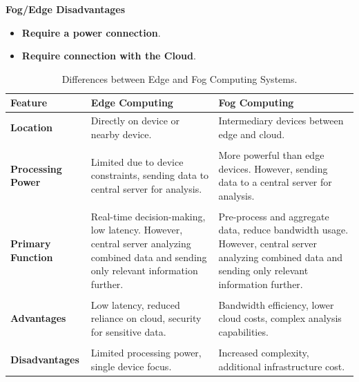 \documentclass[a4paper]{article}
\begin{document}
    \begin{flushleft}
        \textcolor{Red2}{ \textbf{Fog/Edge Disadvantages}}
    \end{flushleft}
    \begin{itemize}
        \item \textbf{Require a power connection}.
        \item \textbf{Require connection with the Cloud}.
    \end{itemize}

    \newpage

    \begin{table}[!htp]
        \centering
        \begin{tabular}{@{} l p{11.5em} p{11.5em} @{}}
            \toprule
            \textbf{Feature} & \textbf{Edge Computing} & \textbf{Fog Computing} \\
            \midrule
            \textbf{Location} & Directly on device or nearby device. & Intermediary devices between edge and cloud. \\
            \\
            \textbf{Processing Power} & Limited due to device constraints, sending data to central server for analysis. & More powerful than edge devices. However, sending data to a central server for analysis. \\
            \\
            \textbf{Primary Function} & Real-time decision-making, low latency. However, central server analyzing combined data and sending only relevant information further. & Pre-process and aggregate data, reduce bandwidth usage. However, central server analyzing combined data and sending only relevant information further. \\
            \\
            \textbf{Advantages} & Low latency, reduced reliance on cloud, security for sensitive data. & Bandwidth efficiency, lower cloud costs, complex analysis capabilities. \\
            \\
            \textbf{Disadvantages} & Limited processing power, single device focus. & Increased complexity, additional infrastructure cost. \\
            \bottomrule
        \end{tabular}
        \caption{Differences between Edge and Fog Computing Systems.}
    \end{table}
\end{document}
